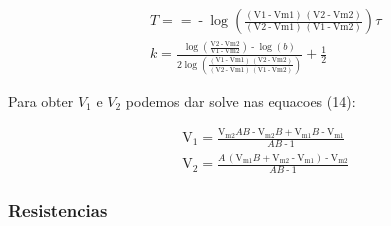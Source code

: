 \begin{equation}
    \begin{aligned}
         & T = \operatorname{=}\operatorname{-} \log{\left( \frac{\left( \ensuremath{\mathrm{V1}}\operatorname{-}\ensuremath{\mathrm{Vm1}}\right) \, \left( \ensuremath{\mathrm{V2}}\operatorname{-}\ensuremath{\mathrm{Vm2}}\right) }{\left( \ensuremath{\mathrm{V2}}\operatorname{-}\ensuremath{\mathrm{Vm1}}\right) \, \left( \ensuremath{\mathrm{V1}}\operatorname{-}\ensuremath{\mathrm{Vm2}}\right) }\right) } \tau                                                                                                                                                                                          \\
         & k = \frac{\log{\left( \frac{\ensuremath{\mathrm{V2}}\operatorname{-}\ensuremath{\mathrm{Vm2}}}{\ensuremath{\mathrm{V1}}\operatorname{-}\ensuremath{\mathrm{Vm2}}}\right) }\operatorname{-}\log{(b)}}{2 \log{\left( \frac{\left( \ensuremath{\mathrm{V1}}\operatorname{-}\ensuremath{\mathrm{Vm1}}\right) \, \left( \ensuremath{\mathrm{V2}}\operatorname{-}\ensuremath{\mathrm{Vm2}}\right) }{\left( \ensuremath{\mathrm{V2}}\operatorname{-}\ensuremath{\mathrm{Vm1}}\right) \, \left( \ensuremath{\mathrm{V1}}\operatorname{-}\ensuremath{\mathrm{Vm2}}\right) }\right) }}\operatorname{+}\frac{1}{2}
    \end{aligned}
\end{equation}

Para obter $V_1$ e $V_2$ podemos dar solve nas equacoes (14):

\begin{equation}
    \begin{aligned}
         & \ensuremath{\mathrm{V_1}}\operatorname{=}\frac{\ensuremath{\mathrm{V_{m2}}} A B\operatorname{-}\ensuremath{\mathrm{V_{m2}}} B\operatorname{+}\ensuremath{\mathrm{V_{m1}}} B\operatorname{-}\ensuremath{\mathrm{V_{m1}}}}{A B\operatorname{-}1}              \\
         & \ensuremath{\mathrm{V_2}}\operatorname{=}\frac{A\, \left( \ensuremath{\mathrm{V_{m1}}} B\operatorname{+}\ensuremath{\mathrm{V_{m2}}}\operatorname{-}\ensuremath{\mathrm{V_{m1}}}\right) \operatorname{-}\ensuremath{\mathrm{V_{m2}}}}{A B\operatorname{-}1}
    \end{aligned}
\end{equation}

\subsubsection{Resistencias}

